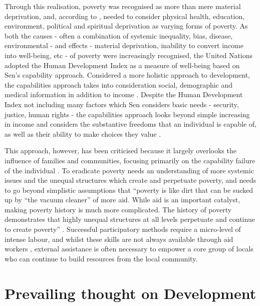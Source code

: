 Through this realisation, poverty was recognised as more than mere material deprivation, and, according to \citet{White2013}, needed to consider physical health, education, environment, political and spiritual deprivation as varying forms of poverty. As both the causes - often a combination of systemic inequality, bias, disease, environmental - and effects - material deprivation, inability to convert income into well-being, etc - of poverty were increasingly recognised, the United Nations adopted the Human Development Index as a measure of well-being based on Sen's capability approach. Considered a more holistic approach to development, the capabilities approach takes into consideration social, demographic and medical information in addition to income \citep{Morrison2009}. Despite the Human Development Index not including many factors which Sen considers basic needs - security, justice, human rights - the capabilities approach looks beyond simple increasing in income and considers the substantive freedoms that an individual is capable of, as well as their ability to make choices they value \citep{Morrison2009, Sen2009}. 


This approach, however, has been criticised because it largely overlooks the influence of families and communities, focusing primarily on the capability failure of the individual \citep{Laderchi2003}. To eradicate poverty needs an understanding of more systemic issues and the unequal structures which create and perpetuate poverty, and needs to go beyond simplistic assumptions that “poverty is like dirt that can be sucked up by “the vacuum cleaner” of more aid. While aid is an important catalyst, making poverty history is much more complicated. The history of poverty demonstrates that highly unequal structures at all levels perpetuate and continue to create poverty” \citep[][p3]{CCIC2005}. Successful participatory methods require a micro-level of intense labour, and whilst these skills are not always available through aid workers \citep{Morrison2009}, external assistance is often necessary to empower a core group of locals who can continue to build resources from the local community.


\section{Prevailing thought on Development}



